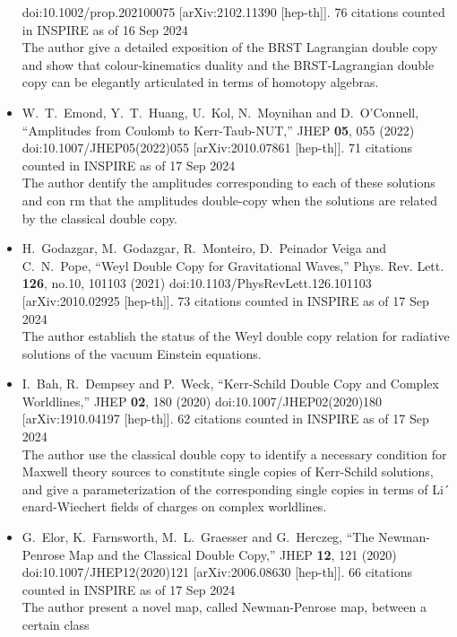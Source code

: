 \documentclass[a4paper,12pt]{article}
\begin{document}
\begin{itemize}
    doi:10.1002/prop.202100075
    [arXiv:2102.11390 [hep-th]].
    76 citations counted in INSPIRE as of 16 Sep 2024\\
    The author give a detailed exposition of the BRST Lagrangian double copy and show that colour-kinematics duality and the BRST-Lagrangian double copy can be
 elegantly articulated in terms of homotopy algebras.
    \item %
    W.~T.~Emond, Y.~T.~Huang, U.~Kol, N.~Moynihan and D.~O'Connell,
    ``Amplitudes from Coulomb to Kerr-Taub-NUT,''
    JHEP \textbf{05}, 055 (2022)
    doi:10.1007/JHEP05(2022)055
    [arXiv:2010.07861 [hep-th]].
    71 citations counted in INSPIRE as of 17 Sep 2024\\
    The author dentify the amplitudes corresponding to each of these solutions and con rm
    that the amplitudes double-copy when the solutions are related by the classical double copy.
    \item  %
    H.~Godazgar, M.~Godazgar, R.~Monteiro, D.~Peinador Veiga and C.~N.~Pope,
    ``Weyl Double Copy for Gravitational Waves,''
    Phys. Rev. Lett. \textbf{126}, no.10, 101103 (2021)
    doi:10.1103/PhysRevLett.126.101103
    [arXiv:2010.02925 [hep-th]].
    73 citations counted in INSPIRE as of 17 Sep 2024\\
    The author establish the status of the Weyl double copy relation for radiative solutions of the vacuum
    Einstein equations.
    \item %
    I.~Bah, R.~Dempsey and P.~Weck,
    ``Kerr-Schild Double Copy and Complex Worldlines,''
    JHEP \textbf{02}, 180 (2020)
    doi:10.1007/JHEP02(2020)180
    [arXiv:1910.04197 [hep-th]].
    62 citations counted in INSPIRE as of 17 Sep 2024\\
    The author use the classical double copy to identify a necessary condition for Maxwell
 theory sources to constitute single copies of Kerr-Schild solutions, and give a parameterization of the corresponding single copies in terms of Li´ enard-Wiechert fields of charges on complex worldlines.
    \item %
    G.~Elor, K.~Farnsworth, M.~L.~Graesser and G.~Herczeg,
    ``The Newman-Penrose Map and the Classical Double Copy,''
    JHEP \textbf{12}, 121 (2020)
    doi:10.1007/JHEP12(2020)121
    [arXiv:2006.08630 [hep-th]].
    66 citations counted in INSPIRE as of 17 Sep 2024\\
    The author present a novel map, called Newman-Penrose map, between a certain class

\end{itemize}
\end{document}
